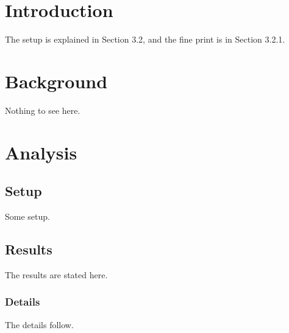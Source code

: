 \documentclass[11pt]{article}
\begin{document}
\tableofcontents
\clearpage

\section{Introduction}
The setup is explained in Section 3.2, and the fine print is in Section 3.2.1.
\clearpage

\section{Background}
Nothing to see here.

\section{Analysis}
\subsection{Setup}
Some setup.
\subsection{Results}
The results are stated here.
\subsubsection{Details}
The details follow.
\end{document}
